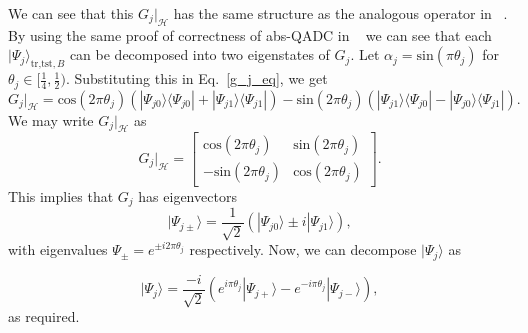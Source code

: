 \documentclass[a4paper,twocolumn,11pt,unpublished]{quantumarticle}
\newcommand{\rang}{\rangle}
\newcommand{\lang}{\langle}
\begin{document}
    
    We can see that this $G_j \Big|_{\mathcal{H}}$ has the same structure as the analogous operator in ~\cite{Mitarai2019}. By using the same proof of correctness of abs-QADC in ~\cite{Mitarai2019} we can see that each $|\Psi_j\rang_{\text{tr,tst}, B}$ can be decomposed into two eigenstates of $G_j$. Let $\alpha_j = \text{sin}(\pi \theta_j)$ for $\theta_j \in [\frac{1}{4}, \frac{1}{2} )$. Substituting this in Eq.~\eqref{g_j_eq}, we get
    \begin{equation}
        G_j \Big|_{\mathcal{H}} = \text{cos}(2 \pi \theta_j) (|\Psi_{j0}\rang \lang \Psi_{j0}| 
        + |\Psi_{j1}\rang \lang \Psi_{j1}|) 
        - \text{sin}(2 \pi \theta_j) (|\Psi_{j1}\rang \lang \Psi_{j0}|
        - |\Psi_{j0}\rang \lang \Psi_{j1}|).
    \end{equation}
    We may write $G_j \Big|_{\mathcal{H}} $ as 
    \begin{equation}
        G_j \Big|_{\mathcal{H}} =
        \begin{bmatrix}
            \text{cos}(2 \pi \theta_j) & \text{sin}(2 \pi \theta_j) \\
            -\text{sin}(2 \pi \theta_j) & \text{cos}(2 \pi \theta_j)
        \end{bmatrix}.
    \end{equation}
    This implies that $G_j$ has eigenvectors 
    \begin{equation}
        |\Psi_{j\pm}\rang = \frac{1}{\sqrt{2}} (|\Psi_{j0}\rang \pm i|\Psi_{j1}\rang),
    \end{equation}
    with eigenvalues $\Psi_{\pm} = e^{\pm i 2\pi \theta_j}$ respectively.
    Now, we can decompose $|\Psi_j \rang$ as
    
    \begin{equation}
        |\Psi_j \rang = \frac{-i}{\sqrt{2}} (e^{i\pi \theta_j} |\Psi_{j+}\rang - e^{-i\pi\theta_j} |\Psi_{j-}\rang),
    \end{equation}
    as required. 
    
    
\end{document}
